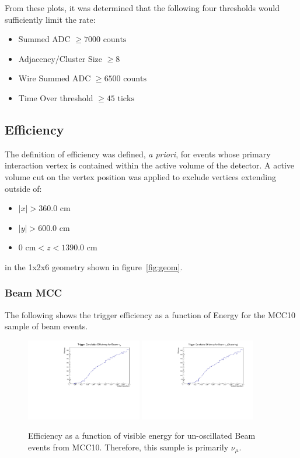\documentclass[10pt]{article}
\begin{document}
From these plots, it was determined that the following four thresholds would sufficiently limit the rate:
\begin{itemize}
    \item Summed ADC $\geq 7000  \text{ counts}$
    \item Adjacency/Cluster Size $\geq 8$
    \item Wire Summed ADC $\geq 6500 \text{ counts}$
    \item Time Over threshold $\geq 45 \text{ ticks}$ 
\end{itemize}

\subsection{Efficiency}

The definition of efficiency was defined, \textit{a priori}, for events whose primary interaction vertex is contained within the active volume of the detector. A active volume cut on the vertex position was applied to exclude vertices extending outside of:
\begin{itemize}
    \item $\mid x \mid > 360.0$ cm
    \item $\mid y \mid > 600.0$ cm
    \item $0\text{ cm} <  z < 1390.0\text{ cm}$ 
\end{itemize}
in the 1x2x6 geometry shown in figure~\ref{fig:geom}. 

\subsubsection{Beam MCC}

The following shows the trigger efficiency as a function of Energy for the MCC10 sample of beam events.

\begin{figure}[H]
    \centering
    \includegraphics[angle=270,width=0.45\textwidth]{UpdatedEff/Differential_Nu_mu_Efficiency_MCC10.pdf}
    \includegraphics[angle=270,width=0.45\textwidth]{UpdatedEff/Differential_Nu_mu_Efficiency_MCC10_CLUS.pdf}
    \caption{Efficiency as a function of visible energy for un-oscillated Beam events from MCC10. Therefore, this sample is primarily $\nu_{\mu}$.}
    \label{fig:eff_beam_numu}
\end{figure}
\end{document}
